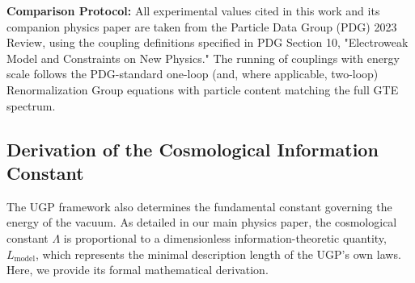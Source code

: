 \documentclass[11pt,twocolumn]{article}
\begin{document}
\textbf{Comparison Protocol:}
All experimental values cited in this work and its companion physics paper are taken from the Particle Data Group (PDG) 2023 Review, using the coupling definitions specified in PDG Section 10, "Electroweak Model and Constraints on New Physics." The running of couplings with energy scale follows the PDG-standard one-loop (and, where applicable, two-loop) Renormalization Group equations with particle content matching the full GTE spectrum.

\subsection{Derivation of the Cosmological Information Constant}
The UGP framework also determines the fundamental constant governing the energy of the vacuum. As detailed in our main physics paper, the cosmological constant $\Lambda$ is proportional to a dimensionless information-theoretic quantity, $L_{\text{model}}$, which represents the minimal description length of the UGP's own laws. Here, we provide its formal mathematical derivation.
\end{document}

